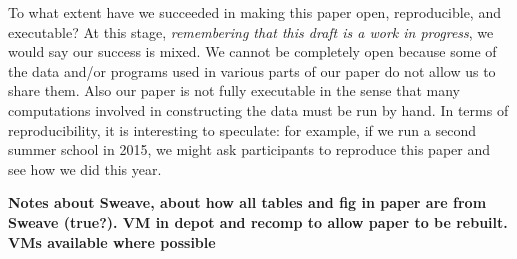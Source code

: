 To what extent have we succeeded in making this paper open, reproducible, and executable?  At this stage,
\emph{remembering that this draft is a work in progress}, we would say our success is mixed.  We cannot be completely open because
some of the data and/or programs used in various parts of our paper do not allow us to share them.  Also our paper is not fully executable in the sense that many 
computations involved in constructing the data must be run by hand.   In terms of reproducibility, it is interesting to speculate: for example, if we run a second summer school in 2015, we might ask participants to reproduce this paper and see how we did this year.



\textbf{Notes about Sweave, about how all tables and fig in paper are from Sweave (true?).  
VM in depot and recomp to allow paper to be rebuilt.
VMs available where possible}


